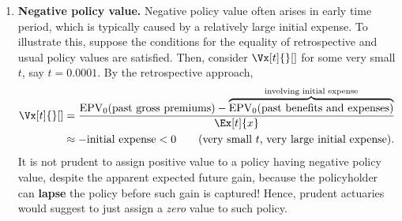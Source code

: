 \begin{enumerate}
\item \textbf{Negative policy value.} Negative policy value often arises in
early time period, which is typically caused by a relatively large initial
expense. To illustrate this, suppose the conditions for the equality of
retrospective and usual policy values are satisfied. Then, consider
\(\Vx[t]{}[]\) for some very small \(t\), say \(t=0.0001\). By the
retrospective approach,
\begin{align*}
\Vx[t]{}[]&=\frac{\epvt{0}{\text{past gross
premiums}}-\overbrace{\epvt{0}{\text{past benefits and
expenses}}}^{\text{involving initial expense}}}{\Ex[t]{x}} \\
&\approx -\text{initial expense}<0\qquad\text{(very small \(t\), very large initial expense)}.
\end{align*}
It is not prudent to assign positive value to a policy having negative policy
value, despite the apparent expected future gain, because the policyholder can
\textbf{lapse} the policy before such gain is captured! Hence, prudent
actuaries would suggest to just assign a \emph{zero} value to such policy.
\end{enumerate}
